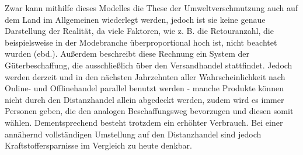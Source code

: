 \documentclass[a4paper, 12pt]{scrartcl}
\makeatletter
\newenvironment{folding}{\endgroup}{\begingroup \def \@currenvir{folding}\edef \@currenvline{\on@line}}
\makeatother
\begin{document}
\begin{folding}
\begin{itemize}
\end{itemize}
Zwar kann mithilfe dieses Modelles die These der Umweltverschmutzung auch auf dem Land im Allgemeinen wiederlegt werden, jedoch ist sie keine genaue Darstellung der Realität, da viele Faktoren, wie z. B. die Retouranzahl, die beispielsweise in der Modebranche überproportional hoch ist, nicht beachtet wurden (ebd.). Außerdem beschreibt diese Rechnung ein System der Güterbeschaffung, die ausschließlich über den Versandhandel stattfindet. Jedoch werden derzeit und in den nächsten Jahrzehnten aller Wahrscheinlichkeit nach Online- und Offlinehandel parallel benutzt werden - manche Produkte können nicht durch den Distanzhandel allein abgedeckt werden, zudem wird es immer Personen geben, die den analogen Beschaffungsweg bevorzugen und diesen somit wählen. Dementsprechend besteht trotzdem ein erhöhter Verbrauch. Bei einer annähernd vollständigen Umstellung auf den Distanzhandel  sind jedoch Kraftstoffersparnisse im Vergleich zu heute denkbar.

\end{folding}
\end{document}
